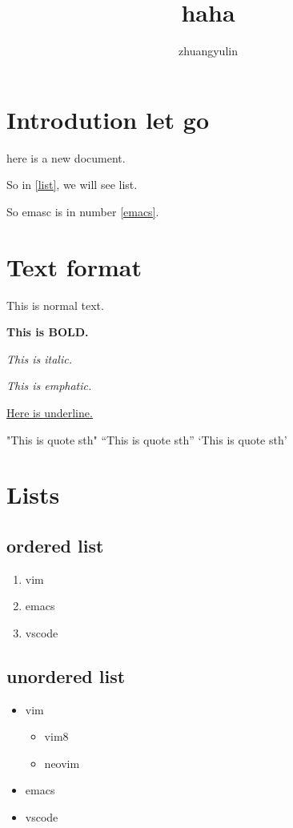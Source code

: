 \documentclass{article}
\author{zhuangyulin}
\title{haha}
\begin{document}
\maketitle

\section{Introdution let go}

here is a new document.

So in \ref{list}, we will see list.

So emasc is in number \ref{emacs}.

\section{Text format}
This is normal text. 

\textbf{This is BOLD.}

\textit{This is italic.}

\emph{This is emphatic.}

\underline{Here is underline.}

"This is quote sth"
``This is quote sth''
`This is quote sth'

\section{Lists\label{list}}
\subsection{ordered list}
\begin{enumerate}
    \item vim
    \item emacs \label{emacs}
    \item vscode
\end{enumerate}

\subsection{unordered list}
\begin{itemize}
    \item vim
        \begin{itemize}
            \item vim8
            \item neovim
        \end{itemize}
    \item emacs
    \item vscode
\end{itemize}
\end{document}
